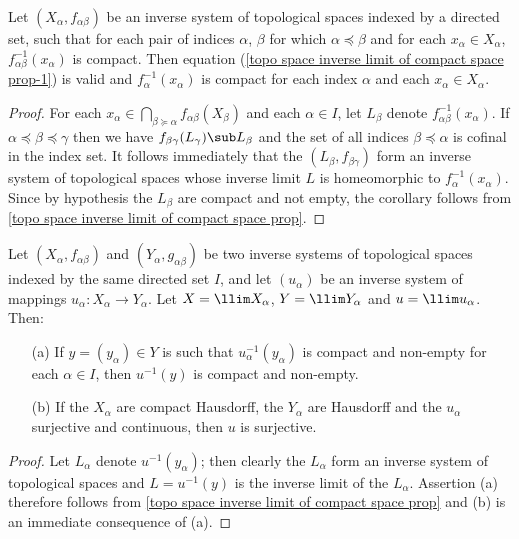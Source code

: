 \begin{corollary}\label{topo space inverse limit of compact fiber}
Let $(X_\alpha,f_{\alpha\beta})$ be an inverse system of topological spaces indexed by a directed set, such that for each pair of indices $\alpha$, $\beta$ for which $\alpha\preceq\beta$ and for each $x_\alpha\in X_\alpha$, $f_{\alpha\beta}^{-1}(x_\alpha)$ is compact. Then equation (\ref{topo space inverse limit of compact space prop-1}) is valid and $f_\alpha^{-1}(x_\alpha)$ is compact for each index $\alpha$ and each $x_\alpha\in X_\alpha$.
\end{corollary}
\begin{proof}
For each $x_\alpha\in\bigcap_{\beta\succeq\alpha}f_{\alpha\beta}(X_\beta)$ and each $\alpha\in I$, let $L_\beta$ denote $f_{\alpha\beta}^{-1}(x_\alpha)$. If $\alpha\preceq\beta\preceq\gamma$ then we have $f_{\beta\gamma}(L_\gamma)\sub L_\beta$ and the set of all indices $\beta\preceq\alpha$ is cofinal in the index set. It follows immediately that the $(L_\beta,f_{\beta\gamma})$ form an inverse system of topological spaces whose inverse limit $L$ is homeomorphic to $f_\alpha^{-1}(x_\alpha)$. Since by hypothesis the $L_\beta$ are compact and not empty, the corollary follows from \cref{topo space inverse limit of compact space prop}.
\end{proof}
\begin{corollary}
Let $(X_\alpha,f_{\alpha\beta})$ and $(Y_\alpha,g_{\alpha\beta})$ be two inverse systems of topological spaces indexed by the same directed set $I$, and let $(u_\alpha)$ be an inverse system of mappings $u_\alpha:X_\alpha\to Y_\alpha$. Let $X=\llim X_\alpha$, $Y=\llim Y_\alpha$ and $u=\llim u_\alpha$. Then:
\begin{itemize}
\item[(a)] If $y=(y_\alpha)\in Y$ is such that $u_\alpha^{-1}(y_\alpha)$ is compact and non-empty for each $\alpha\in I$, then $u^{-1}(y)$ is compact and non-empty.
\item[(b)] If the $X_\alpha$ are compact Hausdorff, the $Y_\alpha$ are Hausdorff and the $u_\alpha$ surjective and continuous, then $u$ is surjective.
\end{itemize}
\end{corollary}
\begin{proof}
Let $L_\alpha$ denote $u^{-1}(y_\alpha)$; then clearly the $L_\alpha$ form an inverse system of topological spaces and $L=u^{-1}(y)$ is the inverse limit of the $L_\alpha$. Assertion (a) therefore follows from \cref{topo space inverse limit of compact space prop} and (b) is an immediate consequence of (a).
\end{proof}
